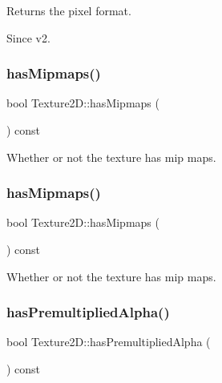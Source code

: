 Returns the pixel format. \begin{DoxySince}{Since}
v2. 
\end{DoxySince}
\mbox{\label{classTexture2D_a5a19e34a8e9f9192f81193f7bf8cdbc2}} 
\subsubsection{\texorpdfstring{has\+Mipmaps()}{hasMipmaps()}\hspace{0.1cm}{\footnotesize\ttfamily [1/2]}}
{\footnotesize\ttfamily bool Texture2\+D\+::has\+Mipmaps (\begin{DoxyParamCaption}{ }\end{DoxyParamCaption}) const}

Whether or not the texture has mip maps. \mbox{\label{classTexture2D_a5a19e34a8e9f9192f81193f7bf8cdbc2}} 
\subsubsection{\texorpdfstring{has\+Mipmaps()}{hasMipmaps()}\hspace{0.1cm}{\footnotesize\ttfamily [2/2]}}
{\footnotesize\ttfamily bool Texture2\+D\+::has\+Mipmaps (\begin{DoxyParamCaption}{ }\end{DoxyParamCaption}) const}

Whether or not the texture has mip maps. \mbox{\label{classTexture2D_aa1cc09ea8b7015cc2bf66a7847ee0990}} 
\subsubsection{\texorpdfstring{has\+Premultiplied\+Alpha()}{hasPremultipliedAlpha()}\hspace{0.1cm}{\footnotesize\ttfamily [1/2]}}
{\footnotesize\ttfamily bool Texture2\+D\+::has\+Premultiplied\+Alpha (\begin{DoxyParamCaption}{ }\end{DoxyParamCaption}) const}

